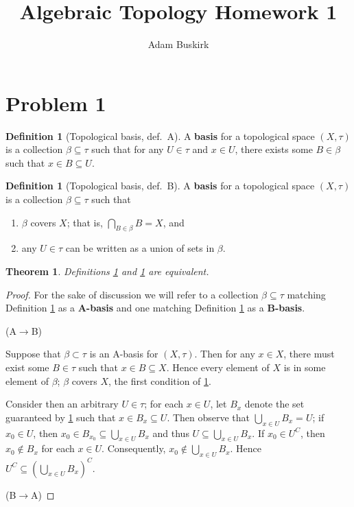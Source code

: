 \documentclass{article}
\title{Algebraic Topology Homework 1}
\author{Adam Buskirk}
\newtheorem{theorem}[subsection]{Theorem}
\theoremstyle{definition}
\newtheorem{definition}[subsection]{Definition}
\newcommand{\p}[1]{\left(#1\right)}
\begin{document}
\maketitle
\section{Problem 1}
\begin{definition}[Topological basis, def.\ A]\label{topbasisA}
A \textbf{basis} for a topological space $(X,\tau)$ is a collection $\beta \subseteq \tau$ 
such that for any $U \in \tau$ and $x \in U$, there exists some $B \in \beta$ such that
$x \in B \subseteq U$.
\end{definition}
\begin{definition}[Topological basis, def.\ B]\label{topbasisB}
A \textbf{basis} for a topological space $(X,\tau)$ is a collection $\beta \subseteq \tau$ such that
\begin{enumerate}
\item $\beta$ covers $X$; that is, $\bigcap_{B \in \beta} B = X$, and
\item any $U \in \tau$ can be written as a union of sets in $\beta$.
\end{enumerate}
\end{definition}
\begin{theorem}
Definitions \ref{topbasisA} and \ref{topbasisB} are equivalent.
\end{theorem}
\begin{proof}
For the sake of discussion we will refer to a collection $\beta \subseteq\tau$ 
matching Definition \ref{topbasisA} as a \textbf{A-basis} 
and one matching Definition \ref{topbasisB} as a \textbf{B-basis}.

(A$\to$B)

Suppose that $\beta\subset\tau$ is an A-basis for $(X,\tau)$. Then for any $x \in X$, there must
exist some $B \in \tau$ such that $x \in B \subseteq X$. Hence every element of $X$ is in some
element of $\beta$; $\beta$ covers $X$, the first condition of \ref{topbasisB}. 

Consider then an arbitrary $U \in \tau$; for each $x \in U$, let $B_x$ denote the set guaranteed 
by \ref{topbasisA} such that $x \in B_x \subseteq U$. Then observe that 
$\bigcup_{x\in U} B_x = U$; if $x_0 \in U$, then $x_0 \in B_{x_0} \subseteq \bigcup_{x\in U} B_x$
and thus $U \subseteq \bigcup_{x\in U} B_x$. If $x_0 \in U^C$, then $x_0 \not\in B_x$ for each
$x\in U$. Consequently, $x_0 \not\in\bigcup_{x\in U} B_x$. Hence $U^C \subseteq \p{\bigcup_{x\in U} B_x}^C$.

(B$\to$A)

\end{proof}
\end{document}
